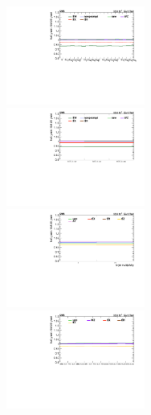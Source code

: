 \begin{table}
  
\end{table}

\begin{figure}
  \begin{subfigure}{\linewidth}
    \centering
    \includegraphics[width=0.5\textwidth]{figures/thirteen-TeV/postfit/ratio_2l_cuG}%
    \includegraphics[width=0.5\textwidth]{figures/thirteen-TeV/postfit/ratio_2l-cr_cuG}
    \includegraphics[width=0.5\textwidth]{figures/thirteen-TeV/postfit/ratio_4l_cuG}%
    \includegraphics[width=0.5\textwidth]{figures/thirteen-TeV/postfit/ratio_3l_cuG}

\end{subfigure}
\end{figure}
